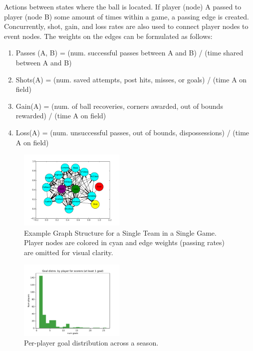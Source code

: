  Actions between states where the ball is located. If player (node) A passed to player (node B) some amount of times within a game, a passing edge is created. Concurrently, shot, gain, and loss rates are also used to connect player nodes to event nodes. The weights on the edges can be formulated as follows: 

\begin{enumerate}

    \item Passes (A, B) = (num. successful passes between A and B) / (time shared between A and B)

    \item Shots(A) = (num. saved attempts, post hits, misses, or goals) / (time A on field) 

    \item Gain(A) = (num. of ball recoveries, corners awarded, out of bounds rewarded) / (time A on field) 

    \item Loss(A) = (num. unsuccessful passes, out of bounds, dispossessions) / (time A on field) 

\end{enumerate}


\begin{figure}[h]
  \centering
  \includegraphics[width=0.45\textwidth]{plots/soccer_networkx.pdf}
  \caption{Example Graph Structure for a Single Team in a Single Game. Player nodes are colored in cyan and edge weights (passing rates) are omitted for visual clarity.}
    \label{fig:example_graph}
\end{figure}


\begin{figure}[h]
  \centering
  \includegraphics[width=0.45\textwidth]{plots/eplper_player_goal_hist.pdf}
  \caption{Per-player goal distribution across a season.}
    \label{fig:per_player_goal_distro}
\end{figure}

